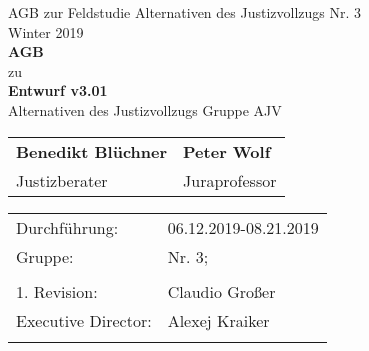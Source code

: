 \documentclass[a4paper, 12pt]{scrartcl}
\begin{document}
    \begin{titlepage}
        \begin{center}
            
	      \large {AGB zur Feldstudie \dq Alternativen des Justizvollzugs{\dq} Nr. 3} \\
            Winter 2019 \\
            \vspace{3cm}
            \textbf{ \Huge AGB} \\
            \vspace{0.5cm}
            \large zu \\
            \vspace{1.5cm}
            \textbf{ \Large Entwurf v3.01} \\
            \large Alternativen des Justizvollzugs Gruppe AJV

            \vspace{3cm}
            \setlength\extrarowheight{3pt}
            \begin{tabularx}{\textwidth}{CC}
            \textbf{Benedikt Bl\"uchner} & \textbf{Peter Wolf} \\
            Justizberater & Juraprofessor\\
            \end{tabularx}
           
            \vspace{4cm}
            
            \begin{tabularx}{\textwidth}{XX}
               Durchführung: & 06.12.2019-08.21.2019 \\ 
               Gruppe: & Nr. 3;  \\ \\
		          1. Revision: & Claudio Gro{\ss}er \\
		          Executive Director: & Alexej Kraiker  \\ \\
            \end{tabularx}
         \end{center}
    \end{titlepage}
\end{document}
